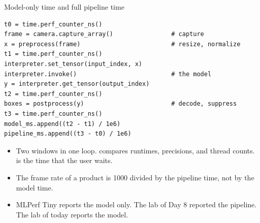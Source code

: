 \begin{frame}[fragile]{Model-only time and full pipeline time}
\begin{lstlisting}[style=python]
t0 = time.perf_counter_ns()
frame = camera.capture_array()                # capture
x = preprocess(frame)                         # resize, normalize
t1 = time.perf_counter_ns()
interpreter.set_tensor(input_index, x)
interpreter.invoke()                          # the model
y = interpreter.get_tensor(output_index)
t2 = time.perf_counter_ns()
boxes = postprocess(y)                        # decode, suppress
t3 = time.perf_counter_ns()
model_ms.append((t2 - t1) / 1e6)
pipeline_ms.append((t3 - t0) / 1e6)
\end{lstlisting}
  \small
  \begin{itemize}
    \item Two windows in one loop.  compares runtimes,
          precisions, and thread counts.  is the time
          that the user waits.
    \item The frame rate of a product is 1000 divided by the pipeline time,
          not by the model time.
    \item MLPerf Tiny reports the model only. The lab of Day 8 reported the
          pipeline. The lab of today reports the model.
  \end{itemize}
\end{frame}

